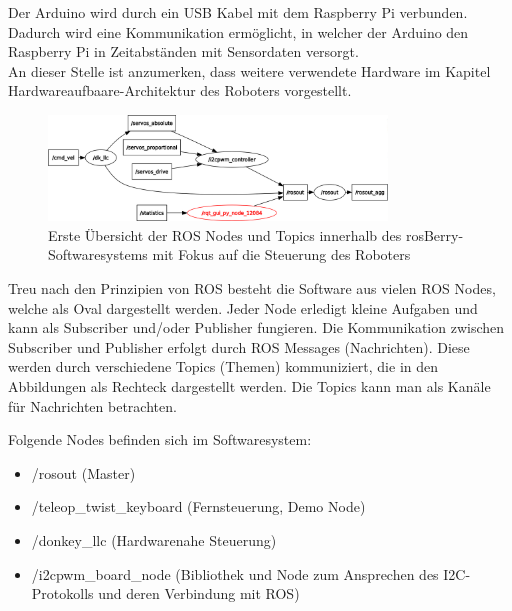 \documentclass[conference]{IEEEtran}
\begin{document}
	Der Arduino wird durch ein USB Kabel mit dem Raspberry Pi verbunden.
	Dadurch wird eine Kommunikation ermöglicht, in welcher der Arduino 
	den Raspberry Pi in Zeitabständen mit Sensordaten versorgt.
	\\
	An dieser Stelle ist anzumerken, dass weitere verwendete Hardware im 
	Kapitel Hardwareaufbaare-Architektur des Roboters vorgestellt.
	
	\begin{figure}[!ht] 
		\centering
		\includegraphics[width=9cm]{img/rosgraph.png}
		\caption{Erste Übersicht der ROS Nodes und Topics innerhalb des rosBerry-Softwaresystems mit Fokus auf die Steuerung des Roboters}
		\label{rosgraph}
	\end{figure}
	
	Treu nach den Prinzipien von ROS besteht die Software aus vielen ROS Nodes, welche als Oval dargestellt werden. 
	Jeder Node erledigt kleine Aufgaben und kann als Subscriber und/oder Publisher fungieren.
	Die Kommunikation zwischen Subscriber und Publisher erfolgt durch ROS Messages (Nachrichten).
	Diese werden durch verschiedene Topics (Themen) kommuniziert, die in den Abbildungen als Rechteck dargestellt werden.
	Die Topics kann man als Kanäle für Nachrichten betrachten.
	
	Folgende Nodes befinden sich im Softwaresystem:
	\begin{itemize}
		\item /rosout (Master)
		\item /teleop\_twist\_keyboard (Fernsteuerung, Demo Node)
		\item /donkey\_llc (Hardwarenahe Steuerung)
		\item /i2cpwm\_board\_node (Bibliothek und Node zum Ansprechen des I2C-Protokolls und deren Verbindung mit ROS)
	\end{itemize}
	
\end{document}
